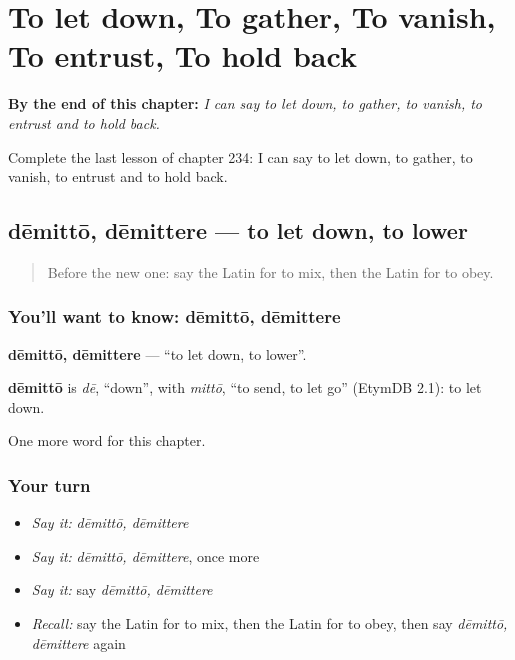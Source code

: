 
\chapter{To let down, To gather, To vanish, To entrust, To hold back}
\label{ch:la-to-let-down-to-gather-to-vanish-to-entrust-to-hold-back}

\begin{chapteropening}
\textbf{By the end of this chapter:} \emph{I can say to let down, to gather, to vanish, to entrust and to hold back.}

Complete the last lesson of chapter 234: I can say to let down, to gather, to vanish, to entrust and to hold back.
\end{chapteropening}

\section[dēmittō, dēmittere]{dēmittō, dēmittere — to let down, to lower}

\label{lesson:LA-C234-demitto}



\begin{quote}
Before the new one: say the Latin for to mix, then the Latin for to obey.
\end{quote}

\subsection*{You'll want to know: dēmittō, dēmittere}
\textbf{dēmittō, dēmittere} — \textquotedblleft{}to let down, to lower\textquotedblright{}.

\begin{cousinweb}
\textbf{dēmittō} is \emph{dē}, \textquotedblleft{}down\textquotedblright{}, with \emph{mittō}, \textquotedblleft{}to send, to let go\textquotedblright{} (EtymDB 2.1): to let down.
\end{cousinweb}

\begin{grammarlens}[title={What you've built}]
One more word for this chapter.
\end{grammarlens}

\subsection*{Your turn}
\begin{itemize}
\raggedright
  \item \emph{Say it:} \emph{dēmittō, dēmittere}
  \item \emph{Say it:} \emph{dēmittō, dēmittere}, once more
  \item \emph{Say it:} say \emph{dēmittō, dēmittere}
  \item \emph{Recall:} say the Latin for to mix, then the Latin for to obey, then say \emph{dēmittō, dēmittere} again
\end{itemize}

